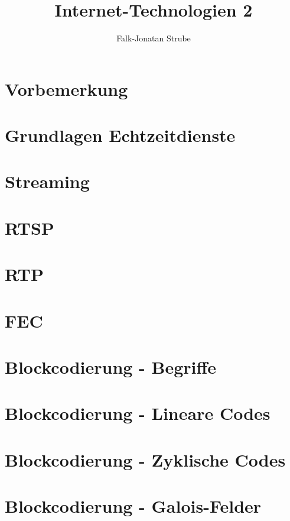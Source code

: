 \documentclass{scrreprt}
\title{Internet-Technologien 2}
\author{Falk-Jonatan Strube}
\begin{document}
\maketitle
\tableofcontents

\chapter*{Vorbemerkung}

\chapter{Grundlagen Echtzeitdienste}


\chapter{Streaming}


\chapter{RTSP}


\chapter{RTP}


\chapter{FEC}


\chapter{Blockcodierung - Begriffe}


\chapter{Blockcodierung - Lineare Codes}


\chapter{Blockcodierung - Zyklische Codes}


\chapter{Blockcodierung - Galois-Felder}



\end{document}
